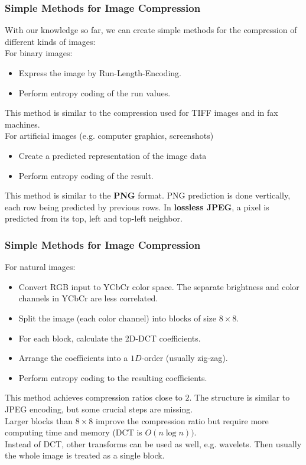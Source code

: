\documentclass{beamer}
\begin{document}
\begin{frame}
\frametitle{Simple Methods for Image Compression}
With our knowledge so far, we can create simple methods for the compression 
of different kinds of images:\\[12pt]

For binary images: 
\begin{itemize}
\item Express the image by Run-Length-Encoding.
\item Perform entropy coding of the run values. 
\end{itemize}
This method is similar to the compression used for {TIFF} images and in {fax machines}.
\\[12pt]

For artificial images (e.g. computer graphics, screenshots)
\begin{itemize}
\item Create a predicted representation of the image data
\item Perform entropy coding of the result.
\end{itemize}
This method is similar to the \textbf{PNG} format. PNG prediction is done vertically,
each row being predicted by previous rows. In \textbf{lossless JPEG}, a pixel is 
predicted from its top, left and top-left neighbor.
\end{frame}

\begin{frame}
\frametitle{Simple Methods for Image Compression}
For natural images: 
\begin{itemize}
\item Convert RGB input to YCbCr color space. The separate brightness and color channels in YCbCr 
are less correlated.
\item Split the image (each color channel) into blocks of size $8\times 8$. 
\item For each block, calculate the 2D-DCT coefficients.
\item Arrange the coefficients into a $1D$-order (usually zig-zag).
\item Perform entropy coding to the resulting coefficients. 
\end{itemize}

This method achieves compression ratios close to $2$. The structure is similar 
to JPEG encoding, but some crucial steps are missing. \\[6pt]

Larger blocks than $8\times 8$ improve the compression ratio but require more computing 
time and memory (DCT is $O(n\log n))$. \\[6pt]

Instead of DCT, other transforms can be used as well, e.g. wavelets. Then usually the whole 
image is treated as a single block.
\end{frame}
\end{document}
